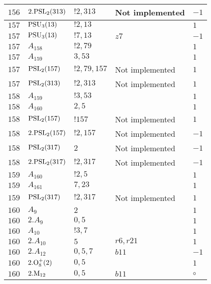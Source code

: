 \documentclass[a4paper, 11pt]{article}
\begin{document}
\begin{longtable}{lllll}
        $ 156 $ & $ 2.{\rm PSL}_{2}(313) $ & $ !2, 313 $ &  Not implemented & $ -1$ \\ \hline
        $ 157 $ & $ {\rm PSU}_{3}(13) $ & $ ! 2,13 $ & $ ~ $ & $ 1$ \\ \hline
        $ 157 $ & $ {\rm PSU}_{3}(13) $ & $ ! 7,13 $ & $ z7 $ & $ -1$ \\ \hline
        $ 157 $ & $ A_{158} $ & $ !2, 79 $ & $ ~ $ & $ 1$ \\ \hline
        $ 157 $ & $ A_{159} $ & $ 3, 53 $ & $ ~ $ & $ 1$ \\ \hline
        $ 157 $ & $ {\rm PSL}_{2}(157) $ & $ !2, 79, 157 $ &  Not implemented & $ 1$ \\ \hline
        $ 157 $ & $ {\rm PSL}_{2}(313) $ & $ !2, 313 $ &  Not implemented & $ 1$ \\ \hline
        $ 158 $ & $ A_{159} $ & $ !3, 53 $ & $ ~ $ & $ 1$ \\ \hline
        $ 158 $ & $ A_{160} $ & $ 2, 5 $ & $ ~ $ & $ 1$ \\ \hline
        $ 158 $ & $ {\rm PSL}_{2}(157) $ & $ !157 $ &  Not implemented & $ 1$ \\ \hline
        $ 158 $ & $ 2.{\rm PSL}_{2}(157) $ & $ !2, 157 $ &  Not implemented & $ -1$ \\ \hline
        $ 158 $ & $ {\rm PSL}_{2}(317) $ & $ 2 $ &  Not implemented & $ -1$ \\ \hline
        $ 158 $ & $ 2.{\rm PSL}_{2}(317) $ & $ !2, 317 $ &  Not implemented & $ -1$ \\ \hline
        $ 159 $ & $ A_{160} $ & $ !2, 5 $ & $ ~ $ & $ 1$ \\ \hline
        $ 159 $ & $ A_{161} $ & $ 7, 23 $ & $ ~ $ & $ 1$ \\ \hline
        $ 159 $ & $ {\rm PSL}_{2}(317) $ & $ !2, 317 $ &  Not implemented & $ 1$ \\ \hline
        $ 160 $ & $ A_{9} $ & $ 2 $ & $ ~ $ & $ 1$ \\ \hline
        $ 160 $ & $ 2.A_{9} $ & $ 0,5 $ & $ ~ $ & $ 1$ \\ \hline
        $ 160 $ & $ A_{10} $ & $ ! 3,7 $ & $ ~ $ & $ 1$ \\ \hline
        $ 160 $ & $ 2.A_{10} $ & $ 5 $ & $ r6, r21 $ & $ 1$ \\ \hline
        $ 160 $ & $ 2.A_{12} $ & $ 0,5,7 $ & $ b11 $ & $ -1$ \\ \hline
        $ 160 $ & $ 2.{\rm O}_{8}^+(2) $ & $ 0,5 $ & $ ~ $ & $ 1$ \\ \hline
        $ 160 $ & $ 2.{\rm M}_{12} $ & $ 0, 5 $ & $ b11 $ &  $\circ$ \\ \hline

\end{longtable}
\end{document}
